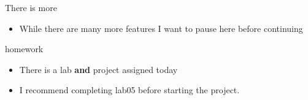 \documentclass{beamer}
\begin{document}
\begin{frame}{There is more}
\begin{itemize}
\item While there are many more features I want to pause here before continuing
\end{itemize}
\end{frame}


\begin{frame}{homework}
\begin{itemize}
\item There is a lab \textbf{and} project assigned today
\item I recommend completing lab05 before starting the project.
\end{itemize}
\end{frame}
\end{document}
